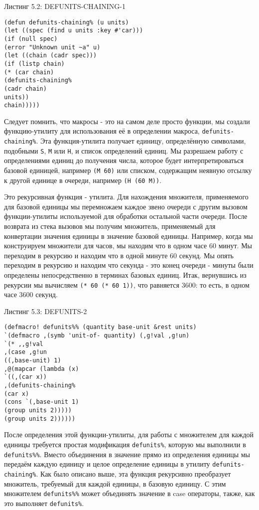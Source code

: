 Листинг 5.2: DEFUNITS-CHAINING-1\label{listing_5.2}
\listbegin
\begin{verbatim}
(defun defunits-chaining% (u units)
(let ((spec (find u units :key #'car)))
(if (null spec)
(error "Unknown unit ~a" u)
(let ((chain (cadr spec)))
(if (listp chain)
(* (car chain)
(defunits-chaining%
(cadr chain)
units))
chain)))))
\end{verbatim}
\listend

Следует помнить, что макросы - это на самом деле просто функции, мы создали функцию-утилиту для использования её в определении макроса, \verb"defunits-chaining%". Эта функция-утилита получает единицу, определённую символами, подобными \verb"S", \verb"M" или \verb"H", и список определений единиц. Мы разрешаем работу с определениями единиц до получения числа, которое будет интерпретироваться базовой единицей, например \verb"(M 60)" или списком, содержащим неявную отсылку к другой единице в очереди, например \verb"(H (60 M))".

Это рекурсивная функция - утилита. Для нахождения множителя, применяемого для базовой единицы мы перемножаем каждое звено очереди с другим вызовом функции-утилиты используемой для обработки остальной части очереди. После возврата из стека вызовов мы получим множитель, применяемый для конвертации значения единицы в значение базовой единицы. Например, когда мы конструируем множители для часов, мы находим что в одном часе 60 минут. Мы переходим в рекурсию и находим что в одной минуте 60 секунд. Мы опять переходим в рекурсию и находим что секунда - это конец очереди - минуты были определены непосредственно в терминах базовых единиц. Итак, вернувшись из рекурсии мы вычисляем \verb"(* 60 (* 60 1))", что равняется 3600: то есть, в одном часе 3600 секунд.

Листинг 5.3: DEFUNITS-2\label{listing_5.3}
\listbegin
\begin{verbatim}
(defmacro! defunits%% (quantity base-unit &rest units)
`(defmacro ,(symb 'unit-of- quantity) (,g!val ,g!un)
`(* ,,g!val
,(case ,g!un
((,base-unit) 1)
,@(mapcar (lambda (x)
`((,(car x))
,(defunits-chaining%
(car x)
(cons `(,base-unit 1)
(group units 2)))))
(group units 2))))))
\end{verbatim}
\listend

После определения этой функции-утилиты, для работы с множителем для каждой единицы требуется простая модификация \verb"defunits%", которую мы выполнили в \verb"defunits%%". Вместо объединения в значение прямо из определения единицы мы передаём каждую единицу и целое определение единицы в утилиту \verb"defunits-chaining%". Как было описано выше, эта функция рекурсивно преобразует множитель, требуемый для каждой единицы, в базовую единицу. С этим множителем \verb"defunits%%" может объединять значение в case операторы, также, как это выполняет \verb"defunits%".

